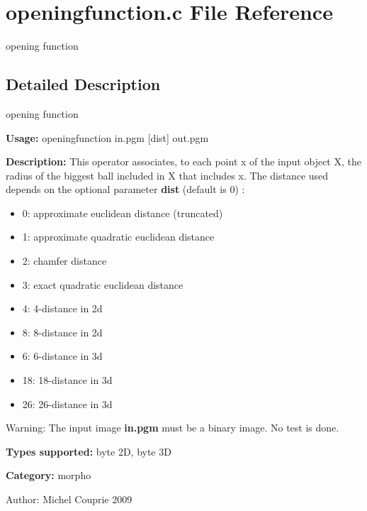\section{openingfunction.c File Reference}
\label{openingfunction_8c}
opening function  




\label{_details}
\subsection{Detailed Description}
opening function 

{\bf Usage:} openingfunction in.pgm [dist] out.pgm

{\bf Description:} This operator associates, to each point x of the input object X, the radius of the biggest ball included in X that includes x. The distance used depends on the optional parameter {\bf dist} (default is 0) : \begin{itemize}
\item 0: approximate euclidean distance (truncated) \item 1: approximate quadratic euclidean distance \item 2: chamfer distance \item 3: exact quadratic euclidean distance \item 4: 4-distance in 2d \item 8: 8-distance in 2d \item 6: 6-distance in 3d \item 18: 18-distance in 3d \item 26: 26-distance in 3d\end{itemize}
\begin{Desc}
\item[Warning:]The input image {\bf in.pgm} must be a binary image. No test is done.\end{Desc}
{\bf Types supported:} byte 2D, byte 3D

{\bf Category:} morpho

\begin{Desc}
\item[Author:]Michel Couprie 2009 \end{Desc}
